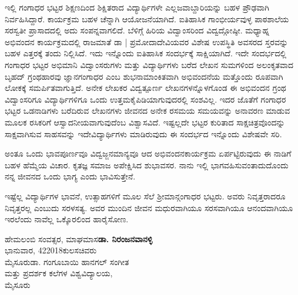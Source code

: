 {ಇಲ್ಲಿ ಗಂಗಾಧರ ಭಟ್ಟರ ಶಿಕ್ಷಣದಿಂದ ಶಿಕ್ಷಿತರಾದ ವಿದ್ಯಾರ್ಥಿಗಳೇ ಎಲ್ಲ\break ಜವಾಬ್ದಾರಿಯನ್ನು ಬಹಳ ಪ್ರೌಢವಾಗಿ ನಿರ್ವಹಿಸಿದ್ದಾರೆ. ಕಾರ್ಯಕ್ರಮ ಬಹಳ ಚೆನ್ನಾಗಿ ಆಯೋಜನೆಯಾಗಿದೆ. ಐತಿಹಾಸಿಕ ಗಾಂಭೀರ್ಯವುಳ್ಳ ಪಾಠಶಾಲೆಯ ಸರಸ್ವತೀ ಪ್ರಾಸಾದದಲ್ಲಿ ಅದು ಸಂಪನ್ನವಾಗಲಿದೆ. ಬೆಳಿಗ್ಗೆ ಹಿರಿಯ ವಿದ್ವಾಂಸರಿಂದ ವಿದ್ವದ್ಗೋಷ್ಠೀ.  ಮಧ್ಯಾಹ್ನ ಅಭಿವಂದನ ಕಾರ್ಯಕ್ರಮದಲ್ಲಿ ರಾಜಮಾತೆ ಡಾ | ಪ್ರಮೋದಾ\break ದೇವಿಯವರ ವಿಶೇಷ ಉಪಸ್ಥಿತಿ ಅವಸರದ ಸ್ತರವನ್ನು ಬಹಳ ಎತ್ತರಕ್ಕೆ ತಂದು ನಿಲ್ಲಿಸಿದೆ. ಇದು ಇನ್ನೊಂದು ಐತಿಹಾಸಿಕ ಸಂದರ್ಭಕ್ಕೆ ಸಾಕ್ಷಿಯಾಗಿದೆ. ಇದೇ ಸಂದರ್ಭದಲ್ಲಿ ಗಂಗಾಧರ ಭಟ್ಟರ ಅಭಿಮಾನಿ ವಿದ್ವಾಂಸರುಗಳು ಮತ್ತು ವಿದ್ಯಾರ್ಥಿಗಳು ಬರೆದ ಲೇಖನ ಸುಮಗಳಿಂದ ಅಲಂಕೃತವಾದ ಬೃಹದ್ ಗ್ರಂಥಹಾರವು ಜ್ಞಾನಗಂಗಾಧರ ಎಂಬ ಶುಭನಾಮಾಂಕಿತವಾಗಿ ಅಭಿವಂದನೆಯ ಮತ್ತೊಂದು ರೂಪವಾಗಿ ಲೋಕಕ್ಕೆ ಸಮರ್ಪಿತವಾಗುತ್ತಿದೆ. ಅನೇಕ ಲೇಖಕರ ವಿದ್ವತ್ಪೂರ್ಣ ಲೇಖನಗಳನ್ನೊಳಗೊಂಡ ಈ ಅಭಿವಂದನ ಗ್ರಂಥ ವಿದ್ವಾಂಸರಿಗೂ ವಿದ್ಯಾರ್ಥಿಗಳಿಗೂ ಒಂದು ಉತ್ತಮ\break ಕೈಪಿಡಿಯಾಗುವುದರಲ್ಲಿ ಸಂಶವಿಲ್ಲ. ಇದರ ಜೊತೆಗೆ ಗಂಗಾಧರ ಭಟ್ಟರ ಒಡನಾಡಿಗಳು ಬರೆದಿರುವ ಲೇಖನಗಳು ಜೀವನದ ಅನೇಕ ರಸಮಯ \enginline{ -} ಸಮಯವನ್ನು ಅನಾವರಣ ಮಾಡುವ ಮೂಲಕ ರಸಿಕರಿಗೆ ಆಸ್ವಾದನೀಯ\-ವಾಗುವುದೆಂಬ ವಿಶ್ವಾಸವಿದೆ. ಇಷ್ಟಲ್ಲದೇ ಭಟ್ಟರ ಕುರಿತಾದ ಸಾಕ್ಷಚಿತ್ರವೊಂದನ್ನು ಸಾಕ್ಷವಾಗಿಸುವ ಸಾಹಸವನ್ನು ಇದೇ\break ವಿದ್ಯಾರ್ಥಿಗಳು ಮಾಡಿರುವುದು ಈ ಸಂದರ್ಭದ ಇನ್ನೊಂದು ವಿಶೇಷವೇ ಸರಿ. 

ಅಂತೂ ಒಂದು ಭಾವಪೂರ್ಣವೂ ವಿದ್ವಜ್ಜನಮಾನ್ಯವೂ ಆದ ಅಭಿವಂದನ\break ಕಾರ್ಯಕ್ರಮ ಏರ್ಪಟ್ಟಿರುವುದು ಈ ನಾಡಿಗೆ ಬಹಳ ಹೆಮ್ಮೆಯ ವಿಚಾರ. ಕೃತಜ್ಞ ಸಮಾಜ ಅಪೇಕ್ಷಿಸಿದ ಶುಭಾವಸರ. ನಾನು ಇಲ್ಲಿ ಭಾಗವಹಿಸುವಂತಾದುದೊಂದು ನನ್ನ ಜೀವನದ ಒಂದು ಭಾಗ್ಯ ಎಂದು ಭಾವಿಸುತ್ತೇನೆ.

ಇಷ್ಟೆಲ್ಲ ವಿದ್ಯಾರ್ಥಿಗಳ ಭಾವನೆ, ಉತ್ಸಾಹಗಳಿಗೆ ಮೂಲ ಸೆಲೆ ಶ್ರೀಮಾನ್\break ಗಂಗಾಧರ ಭಟ್ಟರು. ಅವರು ನಿವೃತ್ತರಾದರೂ ನಿವೃತ್ತರಲ್ಲ ಎಂಬುದು ಸರಳಸತ್ಯ. ಅವರ ಮುಂದಿನ ಜೀವನ ಮಧುರವಾಗಿಯೂ ಸರಸವಾಗಿಯೂ ಆನಂದವಾಗಿಯೂ  ಇರಲೆಂದು ನಾವೆಲ್ಲ ಒಕ್ಕೊರಲಿಂದ ಹಾರೈಸೋಣ.
\bigskip

\noindent
ಹೇಮಲಂಬಿ ಸಂವತ್ಸರ, ಮಾಘಮಾಸ\hfill \textbf{ಡಾ. ನಿರಂಜನವಾನಳ್ಳಿ}\\
ಭಾನುವಾರ, 4\eng{-}2\eng{-}2018\hfill ಕುಲಸಚಿವರು\\
ಮೈಸೂರು\hfill ಡಾ. ಗಂಗೂಬಾಯಿ ಹಾನಗಲ್ ಸಂಗೀತ \\
\phantom{i}\hfill ಮತ್ತು ಪ್ರದರ್ಶಕ ಕಲೆಗಳ ವಿಶ್ವವಿದ್ಯಾಲಯ,\\
\phantom{i}\hfill ಮೈಸೂರು

}
